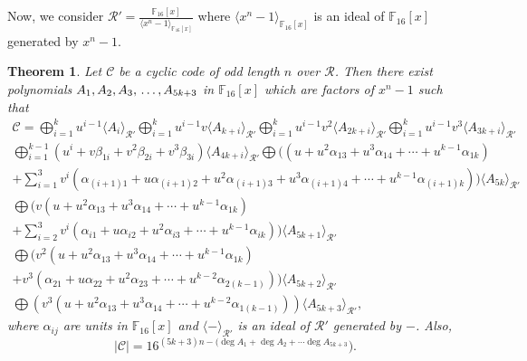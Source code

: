 \documentclass{amsart}
\newtheorem{theorem}{Theorem}[section]
\theoremstyle{definition}
\theoremstyle{remark}
\numberwithin{equation}{section}
\begin{document}
Now, we consider $\mathcal{R}'=\frac{\mathbb F_{16}[x]}{\langle x^n-1 \rangle_{\mathbb F_{16}[x]}}$ where ${\langle x^n-1 \rangle}_{\mathbb F_{16}[x]}$ is an ideal of $\mathbb F_{16}[x]$ generated by  $x^n-1$.
\begin{theorem}\label{th4} Let $\mathcal{C}$ be a cyclic code of odd length $n$ over $\mathcal{R}$. Then there exist polynomials
		$A_1, A_2, A_3,\\ \dots , A_{5k+3}$ in $\mathbb F_{16}[x]$ which are factors of $x^n-1$ such that
\allowdisplaybreaks\begin{gather*}
		\mathcal{C}= \bigoplus_{i=1}^{k} u^{i-1}\langle A_{i}\rangle_{\mathcal{R}'}
  \bigoplus_{i=1}^{k} u^{i-1}v\langle A_{k+i}\rangle_{\mathcal{R}'} \bigoplus_{i=1}^{k} u^{i-1}v^2\langle A_{2k+i}\rangle_{\mathcal{R}'}  \bigoplus_{i=1}^{k} u^{i-1}v^3\langle A_{3k+i}\rangle_{\mathcal{R}'} \\
        \bigoplus_{i=1}^{k-1} (u^i+ v\beta_{1i} + v^2\beta_{2i} + v^3\beta_{3i}) \langle A_{4k+i}\rangle_{\mathcal{R}'}   \bigoplus ((u + u^2\alpha_{13} + u^3\alpha_{14} + \cdots + u^{k-1}\alpha_{1k})
     \\ + \sum_{i=1}^{3} v^i( \alpha_{(i+1)1} + u\alpha_{(i+1)2} + u^2\alpha_{(i+1)3} + u^3\alpha_{(i+1)4} + \cdots + u^{k-1}\alpha_{(i+1)k} ))\langle A_{5k}\rangle_{\mathcal{R}'}
     \\  \bigoplus   (v(u + u^2\alpha_{13} + u^3\alpha_{14} + \cdots + u^{k-1}\alpha_{1k})
       \\+ \sum_{i=2}^{3} v^i( \alpha_{i1} + u\alpha_{i2} + u^2\alpha_{i3} + \cdots + u^{k-1}\alpha_{ik} ))\langle A_{5k+1}\rangle_{\mathcal{R}'}
     \\  \bigoplus  (v^2(u + u^2\alpha_{13} + u^3\alpha_{14} + \cdots + u^{k-1}\alpha_{1k})
       \\+ v^3( \alpha_{21} + u\alpha_{22} + u^2\alpha_{23} +  \cdots + u^{k-2}\alpha_{2(k-1)}))\langle A_{5k+2}\rangle_{\mathcal{R}'}
     \\  \bigoplus  (v^3(u + u^2\alpha_{13} + u^3\alpha_{14} + \cdots + u^{k-2}\alpha_{1(k-1)}))\langle A_{5k+3}\rangle_{\mathcal{R}'},
		\end{gather*}
		where $\alpha_{ij} $ are units in $\mathbb F_{16}[x]$ and $\langle - \rangle_{\mathcal{R}'} $ is an ideal of $\mathcal{R}'$ generated by $-$. Also,
		$$|\mathcal{C}|=16^{(5k+3)n-(\deg A_1+\deg A_2+ \cdots \deg A_{5k+3} }).$$
	\end{theorem}
\end{document}
